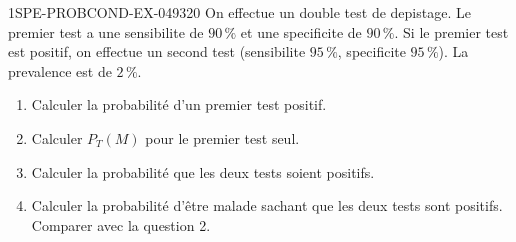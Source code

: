 \begin{exercice}{1SPE-PROBCOND-EX-049}{3}{20}
On effectue un double test de depistage. Le premier test a une sensibilite de $90\,\%$ et une specificite de $90\,\%$. Si le premier test est positif, on effectue un second test (sensibilite $95\,\%$, specificite $95\,\%$). La prevalence est de $2\,\%$.

\begin{enumerate}
  \item Calculer la probabilité d'un premier test positif.
  \item Calculer $P_T(M)$ pour le premier test seul.
  \item Calculer la probabilité que les deux tests soient positifs.
  \item Calculer la probabilité d'être malade sachant que les deux tests sont positifs. Comparer avec la question 2.
\end{enumerate}
\end{exercice}
